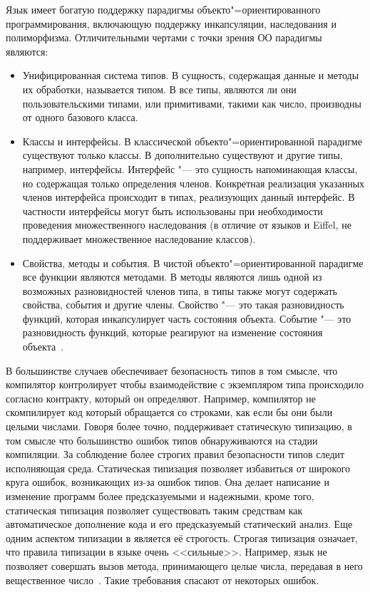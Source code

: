 Язык имеет богатую поддержку парадигмы объекто"=ориентированного программирования, включающую поддержку инкапсуляции, наследования и полиморфизма.
Отличительными чертами \csharp{} с точки зрения ОО парадигмы являются:
\begin{itemize}
  \item Унифицированная система типов. 
        В \csharp{} сущность, содержащая данные и методы их обработки, называется типом.
        В \csharp{} все типы, являются ли они пользовательскими типами, или примитивами, такими как число, производны от одного базового класса.
  \item Классы и интерфейсы.
        В классической объекто"=ориентированной парадигме существуют только классы.
        В \csharp{} дополнительно существуют и другие типы, например, интерфейсы.
        Интерфейс "--- это сущность напоминающая классы, но содержащая только определения членов.
        Конкретная реализация указанных членов интерфейса происходит в типах, реализующих данный интерфейс.
        В частности интерфейсы могут быть использованы при необходимости проведения множественного наследования (в отличие от языков \cpp{} и Eiffel, \csharp{} не поддерживает множественное наследование классов).
  \item Свойства, методы и события.
        В чистой объекто"=ориентированной парадигме все функции являются методами.
        В \csharp{} методы являются лишь одной из возможных разновидностей членов типа, в \csharp{} типы также могут содержать свойства, события и другие члены.
        Свойство "--- это такая разновидность функций, которая инкапсулирует часть состояния объекта.
        Событие "--- это разновидность функций, которые реагируют на изменение состояния объекта~\cite{albahari_2012_en}.
\end{itemize}

В большинстве случаев \csharp{} обеспечивает безопасность типов в том смысле, что компилятор контролирует чтобы взаимодействие с экземпляром типа происходило согласно контракту, который он определяют.
Например, компилятор \csharp{} не скомпилирует код который обращается со строками, как если бы они были целыми числами.
Говоря более точно, \csharp{} поддерживает статическую типизацию, в том смысле что большинство ошибок типов обнаруживаются на стадии компиляции.
За соблюдение более строгих правил безопасности типов следит исполняющая среда.
Статическая типизация позволяет избавиться от широкого круга ошибок, возникающих из-за ошибок типов. 
Она делает написание и изменение программ более предсказуемыми и надежными, кроме того, статическая типизация позволяет существовать таким средствам как автоматическое дополнение кода и его предсказуемый статический анализ.
Еще одним аспектом типизации в \csharp{} является её строгость.
Строгая типизация означает, что правила типизации в языке очень <<сильные>>.
Например, язык не позволяет совершать вызов метода, принимающего целые числа, передавая в него вещественное число~\cite{albahari_2012_en}. 
Такие требования спасают от некоторых ошибок.

